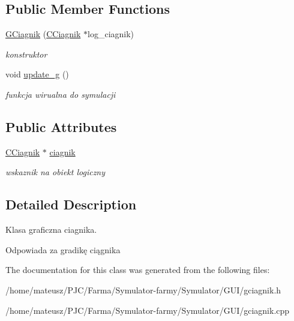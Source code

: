 \subsection*{Public Member Functions}
\begin{DoxyCompactItemize}
\item 
\mbox{\label{class_g_ciagnik_abbc11234acf04f41af72ab6eb696bf69}} 
\mbox{\hyperlink{class_g_ciagnik_abbc11234acf04f41af72ab6eb696bf69}{G\+Ciagnik}} (\mbox{\hyperlink{class_c_ciagnik}{C\+Ciagnik}} $\ast$log\+\_\+ciagnik)
\begin{DoxyCompactList}\small\item\em konstruktor \end{DoxyCompactList}\item 
\mbox{\label{class_g_ciagnik_abf61d60ee2c526153d127d53d2b08dd9}} 
void \mbox{\hyperlink{class_g_ciagnik_abf61d60ee2c526153d127d53d2b08dd9}{update\+\_\+g}} ()
\begin{DoxyCompactList}\small\item\em funkcja wirualna do symulacji \end{DoxyCompactList}\end{DoxyCompactItemize}
\subsection*{Public Attributes}
\begin{DoxyCompactItemize}
\item 
\mbox{\label{class_g_ciagnik_a5782a10e9235642a47daed7bae8aaecd}} 
\mbox{\hyperlink{class_c_ciagnik}{C\+Ciagnik}} $\ast$ \mbox{\hyperlink{class_g_ciagnik_a5782a10e9235642a47daed7bae8aaecd}{ciagnik}}
\begin{DoxyCompactList}\small\item\em wskaznik na obiekt logiczny \end{DoxyCompactList}\end{DoxyCompactItemize}


\subsection{Detailed Description}
Klasa graficzna ciagnika. 

Odpowiada za gradikę ciągnika 

The documentation for this class was generated from the following files\+:\begin{DoxyCompactItemize}
\item 
/home/mateusz/\+P\+J\+C/\+Farma/\+Symulator-\/farmy/\+Symulator/\+G\+U\+I/gciagnik.\+h\item 
/home/mateusz/\+P\+J\+C/\+Farma/\+Symulator-\/farmy/\+Symulator/\+G\+U\+I/gciagnik.\+cpp\end{DoxyCompactItemize}
